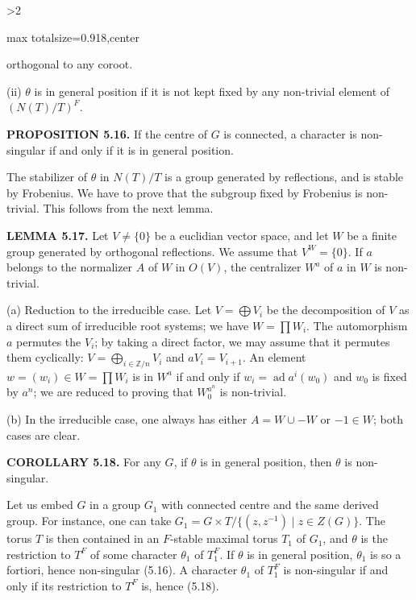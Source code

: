 \documentclass[9pt,twoside]{extarticle}
\newcommand{\EditionPage}[3]{%
  \ifnum#1>2\clearpage\fi
  \pdfbookmark[1]{Printed page #2}{en-folio-#2}%
  \hypertarget{en-physical-#1}{}%
  \noindent\begin{adjustbox}{max totalsize={\textwidth}{0.918\textheight},center}
  \begin{minipage}[t]{\textwidth}
  \fontsize{9.4}{11.1}\selectfont\justifying
  #3
  \end{minipage}
  \end{adjustbox}%
}
\begin{document}
\EditionPage{31}{132}{%
orthogonal to any coroot.\par

(ii) \(\theta\) is in general position if it is not kept fixed by any non-trivial element of \((N(T)/T)^F\).\par

\noindent\textbf{PROPOSITION 5.16.} If the centre of \(G\) is connected, a character is non-singular if and only if it is in general position.\par

The stabilizer of \(\theta\) in \(N(T)/T\) is a group generated by reflections, and is stable by Frobenius. We have to prove that the subgroup fixed by Frobenius is non-trivial. This follows from the next lemma.\par

\noindent\textbf{LEMMA 5.17.} Let \(V\ne\{0\}\) be a euclidian vector space, and let \(W\) be a finite group generated by orthogonal reflections. We assume that \(V^W=\{0\}\). If \(a\) belongs to the normalizer \(A\) of \(W\) in \(O(V)\), the centralizer \(W^a\) of \(a\) in \(W\) is non-trivial.\par

(a) Reduction to the irreducible case. Let \(V=\bigoplus V_i\) be the decomposition of \(V\) as a direct sum of irreducible root systems; we have \(W=\prod W_i\). The automorphism \(a\) permutes the \(V_i\); by taking a direct factor, we may assume that it permutes them cyclically: \(V=\bigoplus_{i\in\mathbb Z/n}V_i\) and \(aV_i=V_{i+1}\). An element \(w=(w_i)\in W=\prod W_i\) is in \(W^a\) if and only if \(w_i=\operatorname{ad}a^i(w_0)\) and \(w_0\) is fixed by \(a^n\); we are reduced to proving that \(W_0^{a^n}\) is non-trivial.\par

(b) In the irreducible case, one always has either \(A=W\cup -W\) or \(-1\in W\); both cases are clear.\par

\noindent\textbf{COROLLARY 5.18.} For any \(G\), if \(\theta\) is in general position, then \(\theta\) is non-singular.\par

Let us embed \(G\) in a group \(G_1\) with connected centre and the same derived group. For instance, one can take \(G_1=G\times T/\{(z,z^{-1})\mid z\in Z(G)\}\). The torus \(T\) is then contained in an \(F\)-stable maximal torus \(T_1\) of \(G_1\), and \(\theta\) is the restriction to \(T^F\) of some character \(\theta_1\) of \(T_1^F\). If \(\theta\) is in general position, \(\theta_1\) is so a fortiori, hence non-singular (5.16). A character \(\theta_1\) of \(T_1^F\) is non-singular if and only if its restriction to \(T^F\) is, hence (5.18).\par

}
\end{document}
